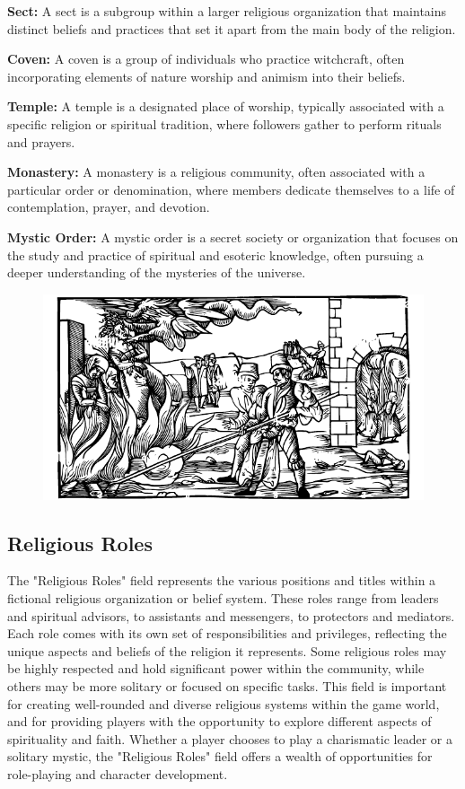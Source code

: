 \documentclass[12pt]{book}
\begin{document}
\textbf{Sect:} A sect is a subgroup within a larger religious organization that maintains distinct beliefs and practices that set it apart from the main body of the religion.

\textbf{Coven:} A coven is a group of individuals who practice witchcraft, often incorporating elements of nature worship and animism into their beliefs.

\textbf{Temple:} A temple is a designated place of worship, typically associated with a specific religion or spiritual tradition, where followers gather to perform rituals and prayers.

\textbf{Monastery:} A monastery is a religious community, often associated with a particular order or denomination, where members dedicate themselves to a life of contemplation, prayer, and devotion.

\textbf{Mystic Order:} A mystic order is a secret society or organization that focuses on the study and practice of spiritual and esoteric knowledge, often pursuing a deeper understanding of the mysteries of the universe.

\begin{figure}[h]
    \centering
    \includegraphics[width=\textwidth]{./images/religion04.pdf}
\end{figure}

\subsection{\textbf{Religious Roles}}

The "Religious Roles" field represents the various positions and titles within a fictional religious organization or belief system. These roles range from leaders and spiritual advisors, to assistants and messengers, to protectors and mediators. Each role comes with its own set of responsibilities and privileges, reflecting the unique aspects and beliefs of the religion it represents. Some religious roles may be highly respected and hold significant power within the community, while others may be more solitary or focused on specific tasks. This field is important for creating well-rounded and diverse religious systems within the game world, and for providing players with the opportunity to explore different aspects of spirituality and faith. Whether a player chooses to play a charismatic leader or a solitary mystic, the "Religious Roles" field offers a wealth of opportunities for role-playing and character development.
\end{document}
